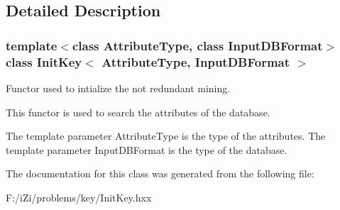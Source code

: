 \subsection{Detailed Description}
\subsubsection*{template$<$class Attribute\-Type, class Input\-DBFormat$>$ class Init\-Key$<$ Attribute\-Type, Input\-DBFormat $>$}

Functor used to intialize the not redundant mining. 

This functor is used to search the attributes of the database.

The template parameter Attribute\-Type is the type of the attributes. The template parameter Input\-DBFormat is the type of the database. 



The documentation for this class was generated from the following file:\begin{CompactItemize}
\item 
F:/i\-Zi/problems/key/Init\-Key.hxx\end{CompactItemize}
